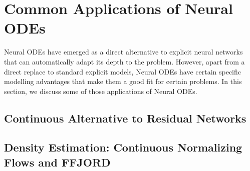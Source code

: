 \section{Common Applications of Neural ODEs}
\label{sec:neural_odes_applications}

Neural ODEs have emerged as a direct alternative to explicit neural networks that can automatically adapt its depth to the problem. However, apart from a direct replace to standard explicit models, Neural ODEs have certain specific modelling advantages that make them a good fit for certain problems. In this section, we discuss some of those applications of Neural ODEs.

\subsection{Continuous Alternative to Residual Networks}
\label{subsec:continuous_alternative_to_residual_networks}

\subsection{Density Estimation: Continuous Normalizing Flows and FFJORD}
\label{subsec:density_estimation_neural_odes}

